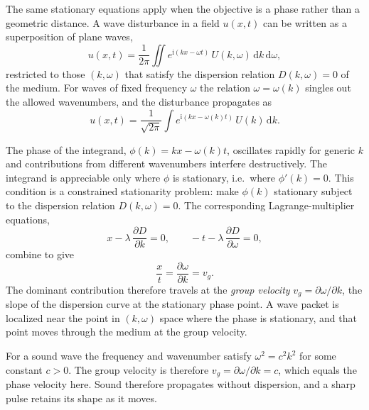 The same stationary equations apply when the objective is a phase rather than a geometric distance. A wave disturbance in a field $u(x,t)$ can be written as a superposition of plane waves,
\begin{equation}
u(x,t)=\frac{1}{2\pi}\iint e^{\mathrm{i}(kx-\omega t)}\,U(k,\omega)\,\mathrm{d}k\,\mathrm{d}\omega,
\end{equation}
restricted to those $(k,\omega)$ that satisfy the dispersion relation $D(k,\omega)=0$ of the medium. For waves of fixed frequency $\omega$ the relation $\omega=\omega(k)$ singles out the allowed wavenumbers, and the disturbance propagates as
\begin{equation}
u(x,t)=\frac{1}{\sqrt{2\pi}}\int e^{\mathrm{i}(kx-\omega(k)t)}\,U(k)\,\mathrm{d}k.
\end{equation}

\begin{example}
The phase of the integrand, $\phi(k)=kx-\omega(k)t$, oscillates rapidly for generic $k$ and contributions from different wavenumbers interfere destructively. The integrand is appreciable only where $\phi$ is stationary, i.e.\ where $\phi'(k)=0$. This condition is a constrained stationarity problem: make $\phi(k)$ stationary subject to the dispersion relation $D(k,\omega)=0$. The corresponding Lagrange-multiplier equations,
\begin{equation}
x-\lambda\,\frac{\partial D}{\partial k}=0,
\qquad
-t-\lambda\,\frac{\partial D}{\partial \omega}=0,
\end{equation}
combine to give
\begin{equation}
\frac{x}{t}=\frac{\partial\omega}{\partial k}=v_g.
\end{equation}
The dominant contribution therefore travels at the \emph{group velocity} $v_g=\partial\omega/\partial k$, the slope of the dispersion curve at the stationary phase point. A wave packet is localized near the point in $(k,\omega)$ space where the phase is stationary, and that point moves through the medium at the group velocity.
\end{example}

\begin{example}
For a sound wave the frequency and wavenumber satisfy $\omega^2=c^2k^2$ for some constant $c>0$. The group velocity is therefore $v_g=\partial\omega/\partial k=c$, which equals the phase velocity here. Sound therefore propagates without dispersion, and a sharp pulse retains its shape as it moves.
\end{example}

